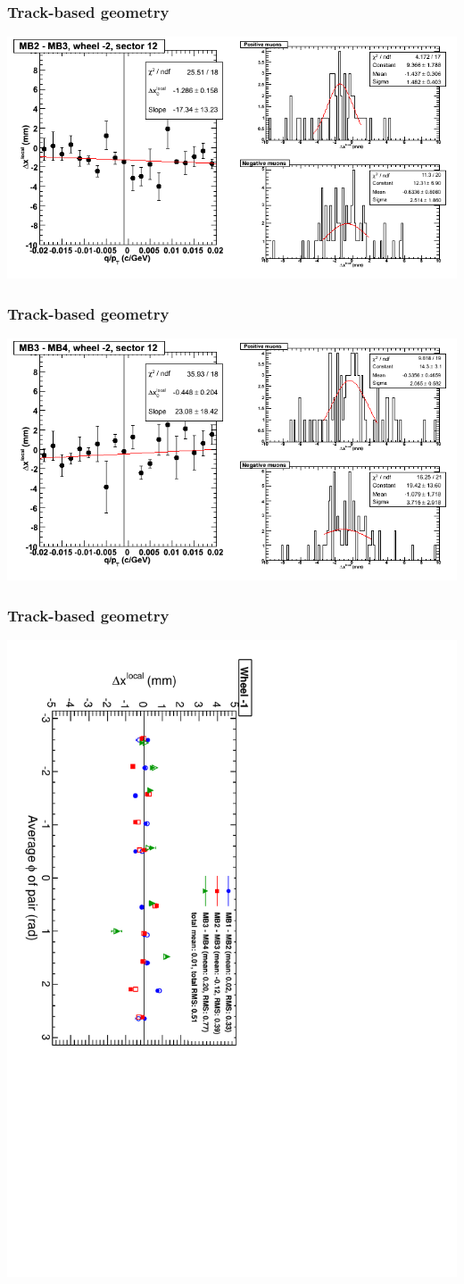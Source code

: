 \documentclass[compress]{beamer}
\begin{document}
\begin{frame}
\frametitle{Track-based geometry}
\includegraphics[width=\linewidth]{NOV4_segdiffs/dt13_resid_A_12_23.png}
\end{frame}

\begin{frame}
\frametitle{Track-based geometry}
\includegraphics[width=\linewidth]{NOV4_segdiffs/dt13_resid_A_12_34.png}
\end{frame}

\begin{frame}
\frametitle{Track-based geometry}
\includegraphics[height=\linewidth, angle=90]{NOV4_segdiff_x_whm1.pdf}
\end{frame}
\end{document}
